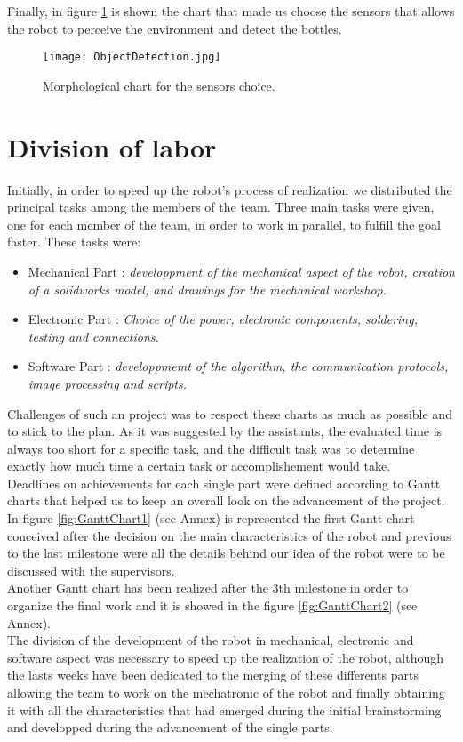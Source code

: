 Finally, in figure \ref{fig:ObjectDetection} is shown the chart that made us choose the sensors that allows the robot to perceive the environment and detect the bottles.                                                
\begin{figure}[H]
 \centering
 \texttt{[image: ObjectDetection.jpg]}
 \caption{Morphological chart for the sensors choice.}
\label{fig:ObjectDetection}
\end{figure}

\section{Division of labor}
Initially, in order to speed up the robot’s process of realization we distributed the principal tasks among the members of the team.
Three main tasks were given, one for each member of the team, in order to work in parallel, to fulfill the goal faster. These tasks were:

\begin{itemize}
\item Mechanical Part : \textit{developpment of the mechanical aspect of the robot, creation of a solidworks model, and drawings for the mechanical workshop.}
\item Electronic Part : \textit{Choice of the power, electronic components, soldering, testing and connections.}
\item Software Part : \textit{developpmemt of the algorithm, the communication protocols, image processing and scripts.}
\end{itemize}

Challenges of such an project was to respect these charts as much as possible and to stick to the plan. As it was suggested by the assistants, the evaluated time is always too short for a specific task, and the  difficult task was to determine exactly how much time a certain task or accomplishement would take. \\

Deadlines on achievements for each single part were defined according to Gantt charts that helped us to keep an overall look on the advancement of the project.
In figure \ref{fig:GanttChart1} (see Annex) is represented the first Gantt chart conceived after the decision on the main characteristics of the robot and previous to the last milestone were all the details behind our idea of the robot were to be discussed with the supervisors.\\

Another Gantt chart has been realized after the 3th milestone in order to organize the final work and it is showed in the figure \ref{fig:GanttChart2} (see Annex).\\

The division of the development of the robot in mechanical, electronic and software aspect was necessary to speed up the realization of the robot, although the lasts weeks have been dedicated to the merging of these differents parts allowing the team to work on the mechatronic of the robot and finally obtaining it with all the characteristics that had emerged during the initial brainstorming and developped during the advancement of the single parts.